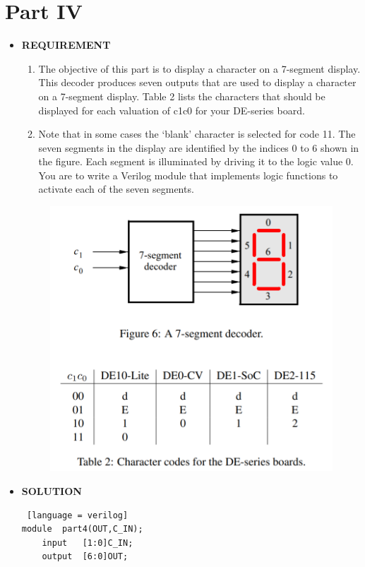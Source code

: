 \documentclass[a4paper, 12pt]{report}
\begin{document}
\section{Part IV }
\begin{itemize}
    \item [] \textbf{REQUIREMENT}
    \begin{enumerate}
        \item The objective of this part is to display a character on a 7-segment display. This decoder produces seven outputs that are used to display a character on a 7-segment display. Table 2 lists the characters that should be displayed for each valuation of c1c0 for your DE-series board.
        \item Note that in some cases the ‘blank’ character is selected for code 11. The seven segments in the display are identified by the indices 0 to 6 shown in the figure. Each segment is illuminated by driving it to the logic value 0. You are to write a Verilog module that implements logic functions to activate each of the seven segments.
    \end{enumerate}    
        \begin{figure}[h]
            \centering
            \includegraphics[scale =0.4]{source/picture/Lab1/1-4.png}
        \end{figure}
    \item [] \textbf{SOLUTION}
        \begin{lstlisting} [language = verilog]
module  part4(OUT,C_IN);
    input 	[1:0]C_IN;
    output	[6:0]OUT;
    

\end{lstlisting}
\end{itemize}
\end{document}
